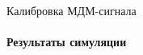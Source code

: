 \documentclass[14pt]{beamer}
\begin{document}
\begin{frame}{Калибровка МДМ-сигнала}
\framesubtitle{Результаты симуляции}
\centering
{}
\end{frame}
\end{document}
